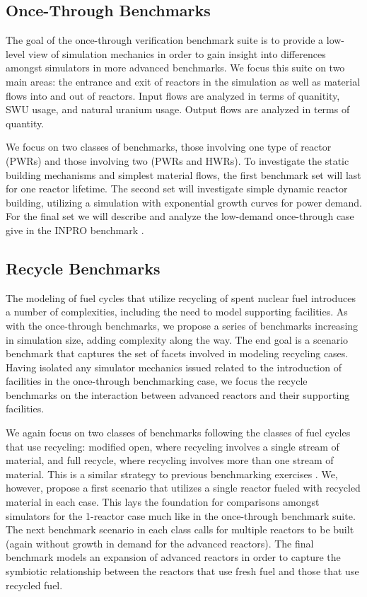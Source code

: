 \documentclass{anstrans}
\begin{document}
\subsection{Once-Through Benchmarks}
The goal of the once-through verification benchmark suite is to provide a
low-level view of simulation mechanics in order to gain insight into differences
amongst simulators in more advanced benchmarks. We focus this suite on two main
areas: the entrance and exit of reactors in the simulation as well as material
flows into and out of reactors. Input flows are analyzed in terms of quanitity,
SWU usage, and natural uranium usage. Output flows are analyzed in terms of
quantity.

We focus on two classes of benchmarks, those involving one type of reactor
(PWRs) and those involving two (PWRs and HWRs). To investigate the static
building mechanisms and simplest material flows, the first benchmark set will
last for one reactor lifetime. The second set will investigate simple dynamic
reactor building, utilizing a simulation with exponential growth curves for
power demand. For the final set we will describe and analyze the low-demand
once-through case give in the INPRO benchmark \cite{_international_2011}.

\subsection{Recycle Benchmarks}
The modeling of fuel cycles that utilize recycling of spent nuclear fuel
introduces a number of complexities, including the need to model supporting
facilities. As with the once-through benchmarks, we propose a series of
benchmarks increasing in simulation size, adding complexity along the way. The
end goal is a scenario benchmark that captures the set of facets involved in
modeling recycling cases. Having isolated any simulator mechanics issued related
to the introduction of facilities in the once-through benchmarking case, we
focus the recycle benchmarks on the interaction between advanced reactors and
their supporting facilities.

We again focus on two classes of benchmarks following the classes of fuel cycles
that use recycling: modified open, where recycling involves a single stream of
material, and full recycle, where recycling involves more than one stream of
material. This is a similar strategy to previous benchmarking exercises
\cite{boucher_specification_2008}. We, however, propose a first scenario that
utilizes a single reactor fueled with recycled material in each case. This lays
the foundation for comparisons amongst simulators for the 1-reactor case much
like in the once-through benchmark suite. The next benchmark scenario in each
class calls for multiple reactors to be built (again without growth in demand
for the advanced reactors). The final benchmark models an expansion of advanced
reactors in order to capture the symbiotic relationship between the reactors
that use fresh fuel and those that use recycled fuel. 
\end{document}
